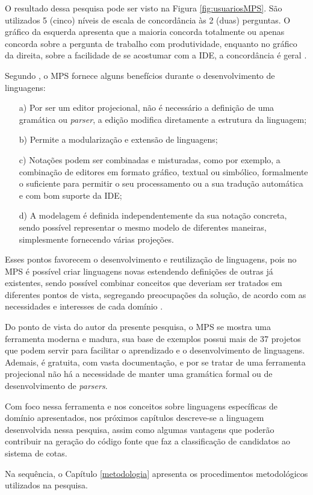 O resultado dessa pesquisa pode ser visto na Figura \ref{fig:usuariosMPS}. São utilizados 5 (cinco) níveis de escala de concordância às 2 (duas) perguntas. O gráfico da esquerda apresenta que a maioria concorda totalmente ou apenas concorda sobre a pergunta de trabalho com produtividade, enquanto no gráfico da direita, sobre a facilidade de se acostumar com a \gls{IDE}, a concordância é geral \cite{voelter2014generic}.



Segundo , o \gls{MPS} fornece alguns benefícios durante o desenvolvimento de linguagens: 
\begin{enumerate}
    \item[a)] Por ser um editor projecional, não é necessário a definição de uma gramática ou \textit{parser}, a edição modifica diretamente a estrutura da linguagem;
    \item[b)] Permite a modularização e extensão de linguagens;
    \item[c)] Notações podem ser combinadas e misturadas, como por exemplo, a combinação de editores em formato gráfico, textual ou simbólico, formalmente o suficiente para permitir o seu processamento ou a sua tradução automática e com bom suporte da IDE;
    \item[d)] A modelagem é definida independentemente da sua notação concreta, sendo possível representar o mesmo modelo de diferentes maneiras, simplesmente fornecendo várias projeções.
    
\end{enumerate}

Esses pontos favorecem o desenvolvimento e reutilização de linguagens, pois no \gls{MPS} é possível criar linguagens novas estendendo definições de outras já existentes, sendo possível combinar conceitos que deveriam ser tratados em diferentes pontos de vista, segregando preocupações da solução, de acordo com as necessidades e interesses de cada domínio \cite{volter2011language}.

Do ponto de vista do autor da presente pesquisa, o \gls{MPS} se mostra uma ferramenta moderna e madura, sua base de exemplos possui mais de 37 projetos que podem servir para facilitar o aprendizado e o desenvolvimento de linguagens. Ademais, é gratuita, com vasta documentação, e por se tratar de uma ferramenta projecional não há a necessidade de manter uma gramática formal ou de desenvolvimento de \textit{parsers}.

Com foco nessa ferramenta e nos conceitos sobre linguagens específicas de domínio apresentados, nos próximos capítulos descreve-se a linguagem desenvolvida nessa pesquisa, assim como algumas vantagens que poderão contribuir na geração do código fonte que faz a classificação de candidatos ao sistema de cotas.

Na sequência, o Capítulo \ref{metodologia} apresenta os procedimentos metodológicos utilizados na pesquisa.